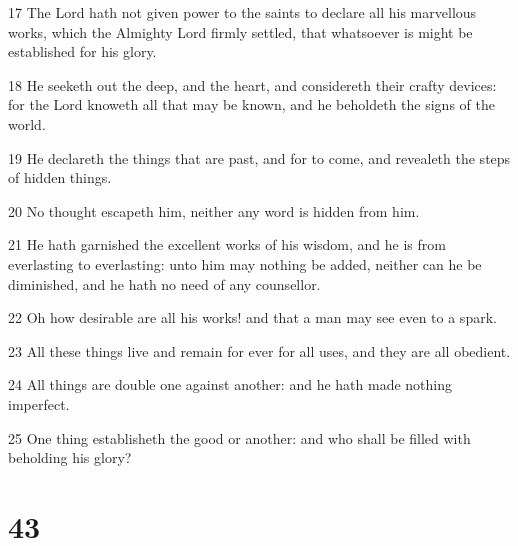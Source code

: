 \par 17 The Lord hath not given power to the saints to declare all his marvellous works, which the Almighty Lord firmly settled, that whatsoever is might be established for his glory.
\par 18 He seeketh out the deep, and the heart, and considereth their crafty devices: for the Lord knoweth all that may be known, and he beholdeth the signs of the world.
\par 19 He declareth the things that are past, and for to come, and revealeth the steps of hidden things.
\par 20 No thought escapeth him, neither any word is hidden from him.
\par 21 He hath garnished the excellent works of his wisdom, and he is from everlasting to everlasting: unto him may nothing be added, neither can he be diminished, and he hath no need of any counsellor.
\par 22 Oh how desirable are all his works! and that a man may see even to a spark.
\par 23 All these things live and remain for ever for all uses, and they are all obedient.
\par 24 All things are double one against another: and he hath made nothing imperfect.
\par 25 One thing establisheth the good or another: and who shall be filled with beholding his glory?

\chapter{43}

